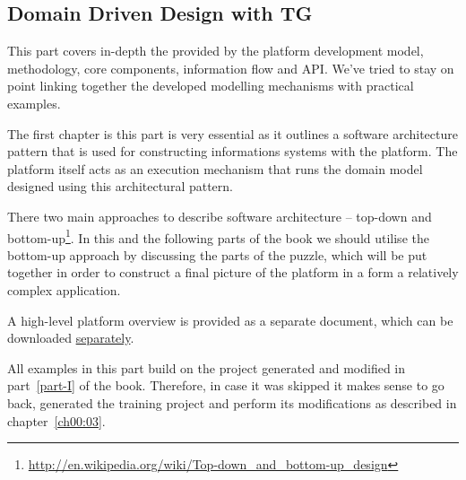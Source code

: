 \begin{partbacktext}
\part{Domain Driven Design with TG}  
  This part covers in-depth the provided by the platform development model, methodology, core components, information flow and API.
  We've tried to stay on point linking together the developed modelling mechanisms with practical examples.
  
  The first chapter is this part is very essential as it outlines a software architecture pattern that is used for constructing informations systems with the platform.
  The platform itself acts as an execution mechanism that runs the domain model designed using this architectural pattern.
  
  There two main approaches to describe software architecture -- top-down and bottom-up\footnote{\url{http://en.wikipedia.org/wiki/Top-down_and_bottom-up_design}}.
  In this and the following parts of the book we should utilise the bottom-up approach by discussing the parts of the puzzle, which will be put together in order to construct a final picture of the platform in a form a relatively complex application.

  A high-level platform overview is provided as a separate document, which can be downloaded \href{http://www.fielden.com.ua/trac/pnl-tg/attachment/wiki/WikiStart/architecture-overview.pdf}{separately}.

  All examples in this part build on the project generated and modified in part~\ref{part-I} of the book.
  Therefore, in case it was skipped it makes sense to go back, generated the training project and perform its modifications as described in chapter~\ref{ch00:03}.
\end{partbacktext}
